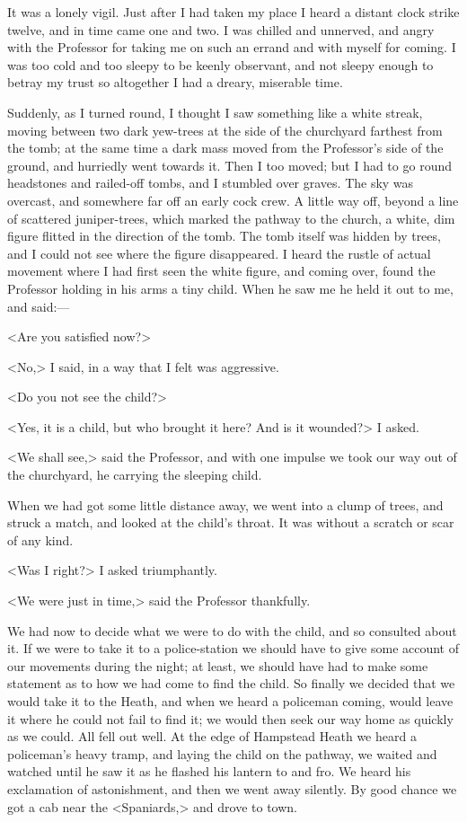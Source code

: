 It was a lonely vigil. Just after I had taken my place I heard a distant clock strike twelve, and in time came one and two. I was chilled and unnerved, and angry with the Professor for taking me on such an errand and with myself for coming. I was too cold and too sleepy to be keenly observant, and not sleepy enough to betray my trust so altogether I had a dreary, miserable time.

Suddenly, as I turned round, I thought I saw something like a white streak, moving between two dark yew-trees at the side of the churchyard farthest from the tomb; at the same time a dark mass moved from the Professor's side of the ground, and hurriedly went towards it. Then I too moved; but I had to go round headstones and railed-off tombs, and I stumbled over graves. The sky was overcast, and somewhere far off an early cock crew. A little way off, beyond a line of scattered juniper-trees, which marked the pathway to the church, a white, dim figure flitted in the direction of the tomb. The tomb itself was hidden by trees, and I could not see where the figure disappeared. I heard the rustle of actual movement where I had first seen the white figure, and coming over, found the Professor holding in his arms a tiny child. When he saw me he held it out to me, and said:—

<Are you satisfied now?>

<No,> I said, in a way that I felt was aggressive.

<Do you not see the child?>

<Yes, it is a child, but who brought it here? And is it wounded?> I asked.

<We shall see,> said the Professor, and with one impulse we took our way out of the churchyard, he carrying the sleeping child.

When we had got some little distance away, we went into a clump of trees, and struck a match, and looked at the child's throat. It was without a scratch or scar of any kind.

<Was I right?> I asked triumphantly.

<We were just in time,> said the Professor thankfully.

We had now to decide what we were to do with the child, and so consulted about it. If we were to take it to a police-station we should have to give some account of our movements during the night; at least, we should have had to make some statement as to how we had come to find the child. So finally we decided that we would take it to the Heath, and when we heard a policeman coming, would leave it where he could not fail to find it; we would then seek our way home as quickly as we could. All fell out well. At the edge of Hampstead Heath we heard a policeman's heavy tramp, and laying the child on the pathway, we waited and watched until he saw it as he flashed his lantern to and fro. We heard his exclamation of astonishment, and then we went away silently. By good chance we got a cab near the <Spaniards,> and drove to town.

